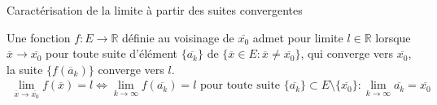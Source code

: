  \begin{parag}{Caractérisation de la limite à partir des suites convergentes}
     \begin{theoreme}
         Une fonction $f: E \to \mathbb{R}$ définie au voisinage de $ \overline{x_0}$ admet pour limite $l \in \mathbb{R}$ lorsque $ \overline{x} \to \overline{x_0}$   pour toute suite d'élément $\{ \overline{a_k}\}$ de $\{ \overline{x} \in E: \overline{x} \neq \overline{x_0}\}$, qui converge vers $ \overline{x_0}$, la suite $\{f( \overline{a}_k)\}$ converge vers $l$.
         \begin{align*}
             \lim_{ \overline{x} \to \overline{x_0}} f( \overline{x}) = l \iff \lim_{ k \to \infty} f( \overline{a_k}) = l \text{ pour toute suite } \{ \overline{a_k}\} \subset E \setminus \{ \overline{x_0}\}: \lim_{k \to \infty} \overline{a_k} = \overline{x_0}
         \end{align*}
     \end{theoreme}
 \end{parag}
 
